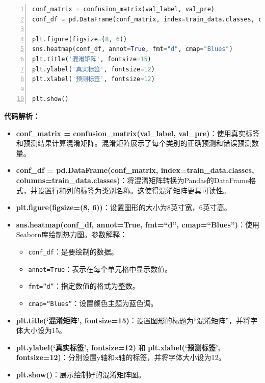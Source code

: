 \begin{lstlisting}[language={python},label={生成和可视化混淆矩阵},caption={生成和可视化混淆矩阵}, basicstyle=\footnotesize\ttfamily, breaklines=true, numbers=left, frame=single]
conf_matrix = confusion_matrix(val_label, val_pre)
conf_df = pd.DataFrame(conf_matrix, index=train_data.classes, columns=train_data.classes)

plt.figure(figsize=(8, 6))
sns.heatmap(conf_df, annot=True, fmt="d", cmap="Blues")
plt.title('混淆矩阵', fontsize=15)
plt.ylabel('真实标签', fontsize=12)
plt.xlabel('预测标签', fontsize=12)
 
plt.show()
\end{lstlisting}
\textbf{代码解析：}
\begin{itemize}
    \item \textbf{conf\_matrix = confusion\_matrix(val\_label, val\_pre)}：使用真实标签和预测结果计算混淆矩阵。混淆矩阵展示了每个类别的正确预测和错误预测数量。
    \item \textbf{conf\_df = pd.DataFrame(conf\_matrix, index=train\_data.classes, \\columns=train\_data.classes)}：将混淆矩阵转换为Pandas的DataFrame格式，并设置行和列的标签为类别名称。这使得混淆矩阵更具可读性。
    \item \textbf{plt.figure(figsize=(8, 6))}：设置图形的大小为8英寸宽，6英寸高。
    \item \textbf{sns.heatmap(conf\_df, annot=True, fmt=“d”, cmap=“Blues”)}：使用Seaborn库绘制热力图。参数解释：
    \begin{itemize}
        \item \texttt{conf\_df}：是要绘制的数据。
        \item \texttt{annot=True}：表示在每个单元格中显示数值。
        \item \texttt{fmt=“d”}：指定数值的格式为整数。
        \item \texttt{cmap=“Blues”}：设置颜色主题为蓝色调。
    \end{itemize}
    \item \textbf{plt.title(‘混淆矩阵’, fontsize=15)}：设置图形的标题为“混淆矩阵”，并将字体大小设为15。
    \item \textbf{plt.ylabel(‘真实标签’, fontsize=12)} 和 \textbf{plt.xlabel(‘预测标签’, fontsize=12)}：分别设置y轴和x轴的标签，并将字体大小设为12。
    \item \textbf{plt.show()}：展示绘制好的混淆矩阵图。
\end{itemize}

